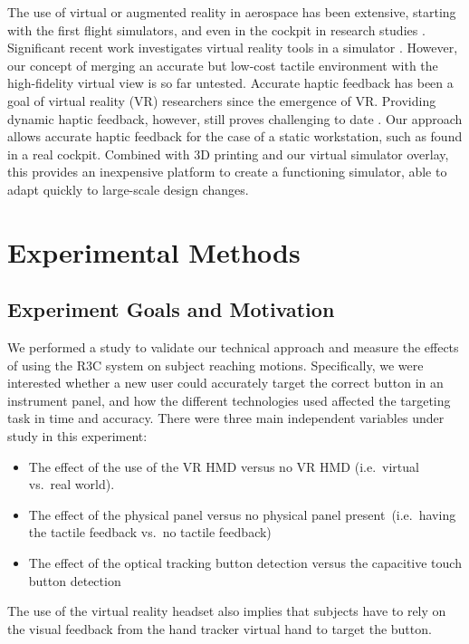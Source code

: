 The use of virtual or augmented reality in aerospace has been extensive, starting with the first flight simulators, and even in the cockpit in research studies \citep{foyle_taxiway_1996, bachelder_fused_2013}.
Significant recent work investigates virtual reality tools in a simulator \citep{h._wan_mrstudio:_2011, i._yavrucuk_low_2011, t._aslandere_virtual_2015}.
However, our concept of merging an accurate but low-cost tactile environment with the high-fidelity virtual view is so far untested.
Accurate haptic feedback has been a goal of virtual reality (VR) researchers since the emergence of VR.
Providing dynamic haptic feedback, however, still proves challenging to date \citep{stone_haptic_2001,lecuyer_simulating_2009}.
Our approach allows accurate haptic feedback for the case of a static workstation, such as found in a real cockpit.
Combined with 3D printing and our virtual simulator overlay, this provides an in\-expensive platform to create a functioning simulator, able to adapt quickly to large-scale design changes.

\section{Experimental Methods}

\subsection{Experiment Goals and Motivation}

We performed a study to validate our technical approach and measure the effects of using the R3C system on subject reaching motions.
Specifically, we were interested whether a new user could accurately target the correct button in an instrument panel, and how the different technologies used affected the targeting task in time and accuracy.
There were three main independent variables under study in this experiment:
\begin{itemize}
    \item The effect of the use of the VR HMD versus no VR HMD (i.e.\ virtual vs.\ real world).
    \item The effect of the physical panel versus no physical panel present\ (i.e.\ having the tactile feedback vs.\ no tactile feedback)
    \item The effect of the optical tracking button detection versus the capacitive touch button detection
\end{itemize}
The use of the virtual reality headset also implies that subjects have to rely on the visual feedback from the hand tracker virtual hand to target the button.


